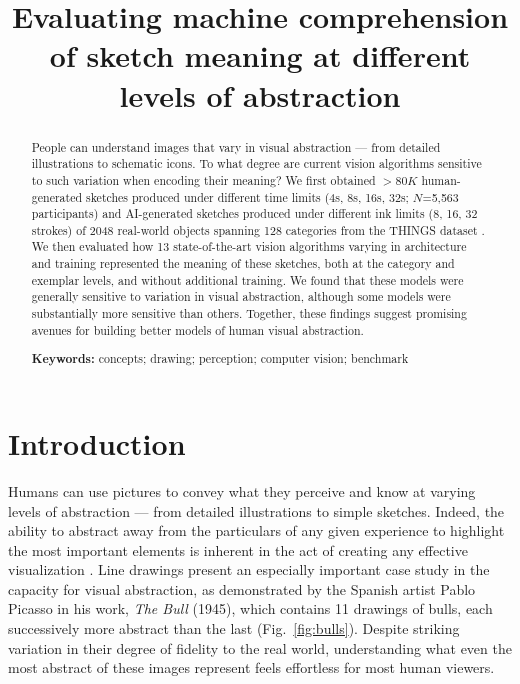 \documentclass[10pt,letterpaper]{article}
\title{Evaluating machine comprehension of sketch meaning at different levels of abstraction}
\begin{document}


\makeatother
\maketitle

\begin{abstract}

People can understand images that vary in visual abstraction --- from detailed illustrations to schematic icons. 
To what degree are current vision algorithms sensitive to such variation when encoding their meaning? 
We first obtained $>80K$ human-generated sketches produced under different time limits (4s, 8s, 16s, 32s; $N$=5,563 participants) and AI-generated sketches \cite{vinker2022clipasso} produced under different ink limits (8, 16, 32 strokes)  of 2048 real-world objects spanning 128 categories from the THINGS dataset \cite{hebart2019things}.
We then evaluated how 13 state-of-the-art vision algorithms varying in architecture and training represented the meaning of these sketches, both at the category and exemplar levels, and without additional training.
We found that these models were generally sensitive to variation in visual abstraction, although some models were substantially more sensitive than others.
Together, these findings suggest promising avenues for building better models of human visual abstraction. 

\textbf{Keywords:} 
concepts; drawing; perception; computer vision; benchmark
\end{abstract}


\section{Introduction}

Humans can use pictures to convey what they perceive and know at varying levels of abstraction --- from detailed illustrations to simple sketches.
Indeed, the ability to abstract away from the particulars of any given experience to highlight the most important elements is inherent in the act of creating any effective visualization \cite{viola2017pondering, chen2020foundations,mccloud1998understanding, mi2009abstraction, nan2011conjoining}.
Line drawings present an especially important case study in the capacity for visual abstraction, as demonstrated by the Spanish artist Pablo Picasso in his work, \textit{The Bull} (1945), which contains 11 drawings of bulls, each successively more abstract than the last (Fig.~\ref{fig:bulls}).
Despite striking variation in their degree of fidelity to the real world, understanding what even the most abstract of these images represent feels effortless for most human viewers.
\end{document}
